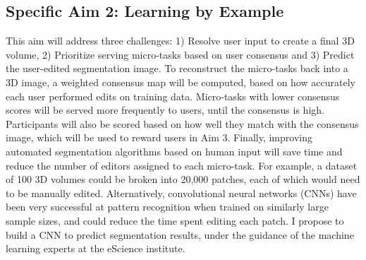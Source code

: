 
\subsection*{Specific Aim 2: Learning by Example}
This aim will address three challenges: 1) Resolve user input to create a final 3D volume, 2) Prioritize serving micro-tasks based on user consensus and 3) Predict the user-edited segmentation image. To reconstruct the micro-tasks back into a 3D image, a weighted consensus map will be computed, based on how accurately each user performed edits on training data. Micro-tasks with lower consensus scores will be served more frequently to users, until the consensus is high. Participants will also be scored based on how well they match with the consensus image, which will be used to reward users in Aim 3. Finally, improving automated segmentation algorithms based on human input will save time and reduce the number of editors assigned to each micro-task. For example, a dataset of 100 3D volumes could be broken into 20,000 patches, each of which would need to be manually edited. Alternatively, convolutional neural networks (CNNs) have been very successful at pattern recognition when trained on similarly large sample sizes, and could reduce the time spent editing each patch. I propose to build a CNN to predict segmentation results, under the guidance of the machine learning experts at the eScience institute. 

